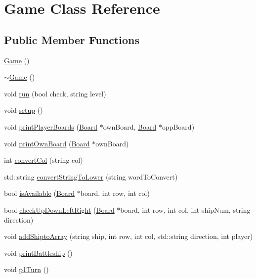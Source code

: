 \hypertarget{classGame}{}\section{Game Class Reference}
\label{classGame}
\subsection*{Public Member Functions}
\begin{DoxyCompactItemize}
\item 
\hyperlink{classGame_ad59df6562a58a614fda24622d3715b65}{Game} ()
\item 
\hyperlink{classGame_ae3d112ca6e0e55150d2fdbc704474530}{$\sim$\+Game} ()
\item 
void \hyperlink{classGame_abaeddb168166a7c6db3d7d82a6e160b5}{run} (bool check, string level)
\item 
void \hyperlink{classGame_ae4618ba40eabbbe65e35f1bb239aa29b}{setup} ()
\item 
void \hyperlink{classGame_a5d46e31df48c320c905bf23833e75bfd}{print\+Player\+Boards} (\hyperlink{classBoard}{Board} $\ast$own\+Board, \hyperlink{classBoard}{Board} $\ast$opp\+Board)
\item 
void \hyperlink{classGame_ac86bc812b7fc44720384167dbe56b964}{print\+Own\+Board} (\hyperlink{classBoard}{Board} $\ast$own\+Board)
\item 
int \hyperlink{classGame_a5f36a0e15d866f8ecf2f2d967a8e352b}{convert\+Col} (string col)
\item 
std\+::string \hyperlink{classGame_afc9a0a0e86c33685d5920cb27061f756}{convert\+String\+To\+Lower} (string word\+To\+Convert)
\item 
bool \hyperlink{classGame_ac5375584508e57a7172388b1d60ab5db}{is\+Available} (\hyperlink{classBoard}{Board} $\ast$board, int row, int col)
\item 
bool \hyperlink{classGame_a4e1607f0350c6c7d585059585777bf43}{check\+Up\+Down\+Left\+Right} (\hyperlink{classBoard}{Board} $\ast$board, int row, int col, int ship\+Num, string direction)
\item 
void \hyperlink{classGame_ab7dd82dc16ae4dee7031e43b761ffb36}{add\+Shipto\+Array} (string ship, int row, int col, std\+::string direction, int player)
\item 
void \hyperlink{classGame_a56decb134b379171d8c9d713cb761187}{print\+Battleship} ()
\item 
void \hyperlink{classGame_a0d8e7489f8a9a0080e4a1cb170462b55}{p1\+Turn} ()
\item 

\end{DoxyCompactItemize}
